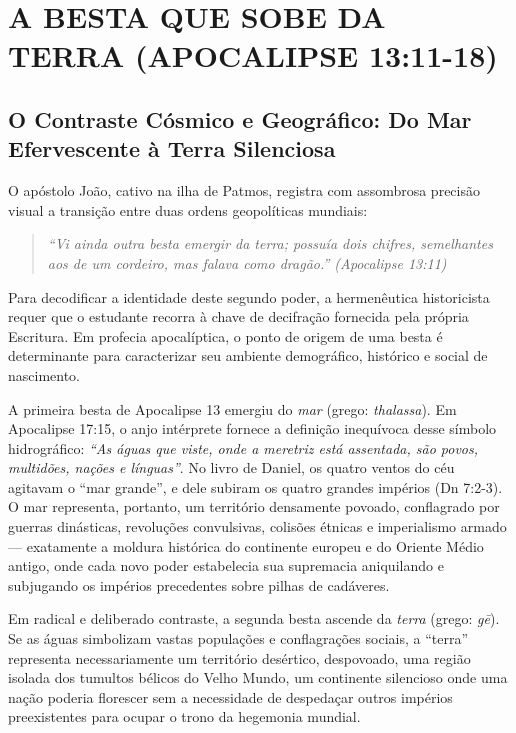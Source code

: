 \section{A BESTA QUE SOBE DA TERRA (APOCALIPSE 13:11-18)}



\subsection{O Contraste Cósmico e Geográfico: Do Mar Efervescente à Terra Silenciosa}


O apóstolo João, cativo na ilha de Patmos, registra com assombrosa precisão visual a transição entre duas ordens geopolíticas mundiais:


\begin{quote}
\itshape \textit{``Vi ainda outra besta emergir da terra; possuía dois chifres, semelhantes aos de um cordeiro, mas falava como dragão.''} (Apocalipse 13:11)
\end{quote}


Para decodificar a identidade deste segundo poder, a hermenêutica historicista requer que o estudante recorra à chave de decifração fornecida pela própria Escritura. Em profecia apocalíptica, o ponto de origem de uma besta é determinante para caracterizar seu ambiente demográfico, histórico e social de nascimento.

A primeira besta de Apocalipse 13 emergiu do \textit{mar} (grego: \textit{thalassa}). Em Apocalipse 17:15, o anjo intérprete fornece a definição inequívoca desse símbolo hidrográfico: \textit{``As águas que viste, onde a meretriz está assentada, são povos, multidões, nações e línguas''}. No livro de Daniel, os quatro ventos do céu agitavam o ``mar grande'', e dele subiram os quatro grandes impérios (Dn 7:2-3). O mar representa, portanto, um território densamente povoado, conflagrado por guerras dinásticas, revoluções convulsivas, colisões étnicas e imperialismo armado — exatamente a moldura histórica do continente europeu e do Oriente Médio antigo, onde cada novo poder estabelecia sua supremacia aniquilando e subjugando os impérios precedentes sobre pilhas de cadáveres.

Em radical e deliberado contraste, a segunda besta ascende da \textit{terra} (grego: \textit{gē}). Se as águas simbolizam vastas populações e conflagrações sociais, a ``terra'' representa necessariamente um território desértico, despovoado, uma região isolada dos tumultos bélicos do Velho Mundo, um continente silencioso onde uma nação poderia florescer sem a necessidade de despedaçar outros impérios preexistentes para ocupar o trono da hegemonia mundial.

